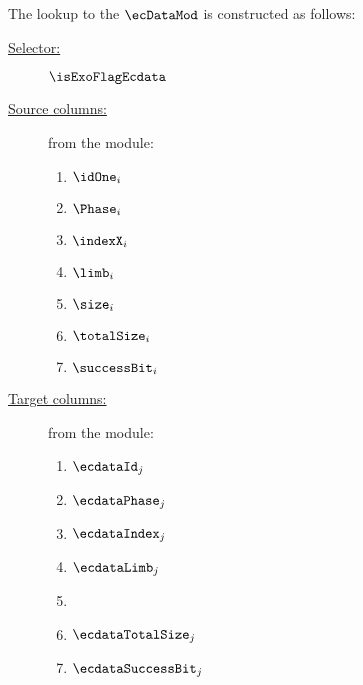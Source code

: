 The lookup to the $\ecDataMod$ is constructed as follows:
\begin{description}
	\item[\underline{Selector:}] $\isExoFlagEcdata$
	\item[\underline{Source columns:}] from the \mmioMod{} module:
		\begin{multicols}{3}
			\begin{enumerate}
				\item $\idOne      _{i}$
				\item $\Phase      _{i}$
				\item $\indexX     _{i}$
				\item $\limb       _{i}$
				\item $\size       _{i}$
				\item $\totalSize  _{i}$
				\item $\successBit _{i}$
			\end{enumerate}
		\end{multicols}
	\item[\underline{Target columns:}] from the \ecDataMod{} module: 
			\begin{multicols}{3}
				\begin{enumerate}
					\item $\ecdataId    _{j}$
					\item $\ecdataPhase _{j}$
					\item $\ecdataIndex _{j}$
					\item $\ecdataLimb  _{j}$
					\item {}
					\item $\ecdataTotalSize  _{j}$
					\item $\ecdataSuccessBit _{j}$
				\end{enumerate}
			\end{multicols}
\end{description}
